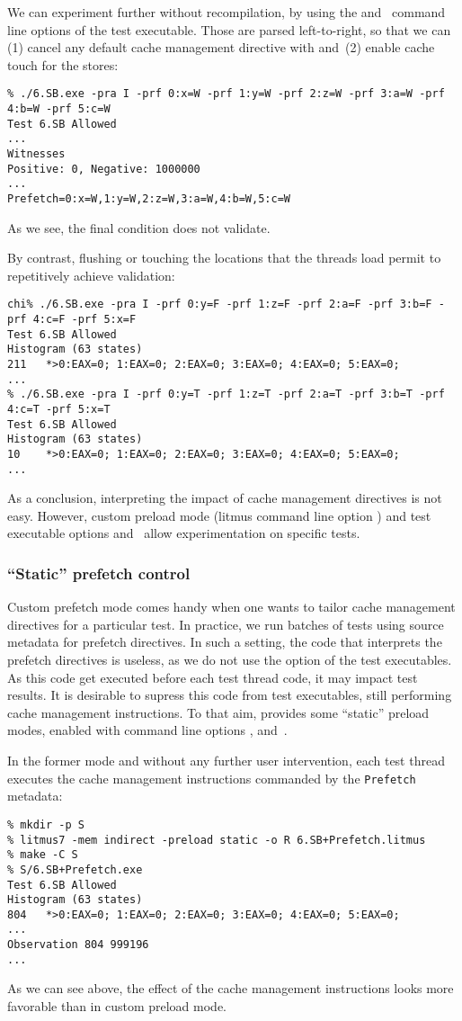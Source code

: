 We can experiment further without recompilation, by
using the  and~ command line options of
the test executable. Those are parsed left-to-right, so that we can
(1) cancel any default cache management directive with
 and~(2) enable cache touch for the stores:
\begin{verbatim}
% ./6.SB.exe -pra I -prf 0:x=W -prf 1:y=W -prf 2:z=W -prf 3:a=W -prf 4:b=W -prf 5:c=W
Test 6.SB Allowed
...
Witnesses
Positive: 0, Negative: 1000000
...
Prefetch=0:x=W,1:y=W,2:z=W,3:a=W,4:b=W,5:c=W
\end{verbatim}
As we see, the final condition does not validate.

By contrast, flushing or touching the locations that the threads load permit to
repetitively achieve validation:
\begin{verbatim}
chi% ./6.SB.exe -pra I -prf 0:y=F -prf 1:z=F -prf 2:a=F -prf 3:b=F -prf 4:c=F -prf 5:x=F
Test 6.SB Allowed
Histogram (63 states)
211   *>0:EAX=0; 1:EAX=0; 2:EAX=0; 3:EAX=0; 4:EAX=0; 5:EAX=0;
...
% ./6.SB.exe -pra I -prf 0:y=T -prf 1:z=T -prf 2:a=T -prf 3:b=T -prf 4:c=T -prf 5:x=T
Test 6.SB Allowed
Histogram (63 states)
10    *>0:EAX=0; 1:EAX=0; 2:EAX=0; 3:EAX=0; 4:EAX=0; 5:EAX=0;
...
\end{verbatim}
As a conclusion, interpreting the impact of cache management
directives is not easy. However, custom preload mode
(litmus command line option ) and test executable
options  and~ allow experimentation on specific tests.


\subsubsection{``Static'' prefetch control}
Custom prefetch mode comes handy when one wants to tailor cache management
directives for a particular test.
In practice, we run batches of tests using source metadata for
prefetch directives.
In such a setting, the code that interprets the
prefetch directives is useless,
as we do not use the  option of the test executables.
As this code get executed before each test thread code, it may impact test
results.
It is desirable to supress this code from test executables, still
performing cache management instructions.
To that aim, \litmus{} provides some ``static'' preload modes, enabled
with command line options ,
 and~.

In the former mode   and without any further user
intervention, each test thread executes the cache management
instructions commanded by the \verb+Prefetch+ metadata:
\begin{verbatim}
% mkdir -p S
% litmus7 -mem indirect -preload static -o R 6.SB+Prefetch.litmus
% make -C S
% S/6.SB+Prefetch.exe
Test 6.SB Allowed
Histogram (63 states)
804   *>0:EAX=0; 1:EAX=0; 2:EAX=0; 3:EAX=0; 4:EAX=0; 5:EAX=0;
...
Observation 804 999196
...
\end{verbatim}
As we can see above, the effect of the  cache management
instructions looks more favorable than in custom preload mode.


